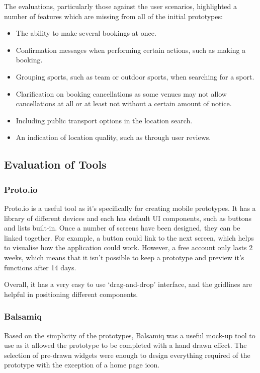 The evaluations, particularly those against the user scenarios, highlighted a
number of features which are missing from all of the initial prototypes:

\begin{itemize}
	\item The ability to make several bookings at once.
	\item Confirmation messages when performing certain actions, such as making
		a booking.
	\item Grouping sports, such as team or outdoor sports, when searching for a
		sport.
	\item Clarification on booking cancellations as some venues may not allow
		cancellations at all or at least not without a certain amount of
		notice.
	\item Including public transport options in the location search.
	\item An indication of location quality, such as through user reviews.
\end{itemize}

\subsection{Evaluation of Tools}

\subsubsection{Proto.io}

Proto.io\cite{protoio} is a useful tool as it's specifically for creating
mobile prototypes.  It has a library of different devices and each has default
UI components, such as buttons and lists built-in. Once a number of screens
have been designed, they can be linked together. For example, a button could
link to the next screen, which helps to visualise how the application could
work.  However, a free account only lasts 2 weeks, which means that it isn’t
possible to keep a prototype and preview it’s functions after 14 days.

Overall, it has a very easy to use `drag-and-drop' interface, and the gridlines
are helpful in positioning different components.

\subsubsection{Balsamiq}

Based on the simplicity of the prototypes, Balsamiq\cite{balsamiq} was a useful
mock-up tool to use as it allowed the prototype to be completed with a hand
drawn effect.  The selection of pre-drawn widgets were enough to design
everything required of the prototype with the exception of a home page icon.

